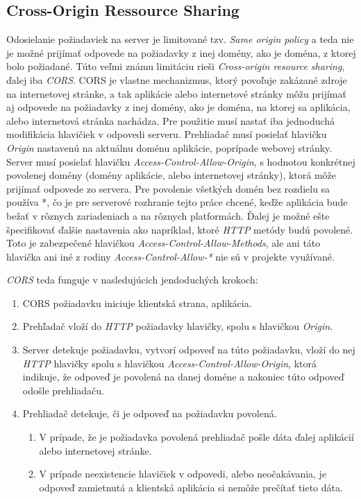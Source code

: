 \subsection{Cross-Origin Ressource Sharing}
Odosielanie požiadaviek na server je limitované tzv. \textit{Same origin policy} a teda nie je možné prijímať odpovede na požiadavky z inej domény, ako je doména, z ktorej bolo požiadané. Túto veľmi známu limitáciu rieši \textit{Cross-origin resource sharing}, ďalej iba \textit{CORS}. CORS je vlastne mechanizmus, ktorý povoľuje zakázané zdroje na internetovej stránke, a tak aplikácie alebo internetové stránky môžu prijímať aj odpovede na požiadavky z inej domény, ako je doména, na ktorej sa aplikácia, alebo internetová stránka nachádza. Pre použitie musí nastať iba jednoduchá modifikácia hlavičiek v odpovedi serveru. Prehliadač musí posielať hlavičku \textit{Origin} nastavenú na aktuálnu doménu aplikácie, poprípade webovej stránky. Server musí posielať hlavičku \textit{Access-Control-Allow-Origin}, s hodnotou konkrétnej povolenej domény (domény aplikácie, alebo internetovej stránky), ktorá môže prijímať odpovede zo servera. Pre povolenie všetkých domén bez rozdielu sa používa *, čo je pre serverové rozhranie tejto práce chcené, keďže aplikácia bude bežať v rôznych zariadeniach a na rôznych platformách. Ďalej je možné ešte špecifikovať ďalšie nastavenia ako napríklad, ktoré \textit{HTTP} metódy budú povolené. Toto je zabezpečené hlavičkou \textit{Access-Control-Allow-Methods}, ale ani táto hlavička ani iné z rodiny \textit{Access-Control-Allow-*} nie sú v projekte využívané. 

\textit{CORS} teda funguje v nasledujúcich jendoduchých krokoch:
\begin{enumerate}
\item CORS požiadavku iniciuje klientská strana, aplikácia.
\item Prehľadač vloží do \textit{HTTP} požiadavky hlavičky, spolu s hlavičkou \textit{Origin}.
\item Server detekuje požiadavku, vytvorí odpoveď na túto požiadavku, vloží do nej \textit{HTTP} hlavičky spolu s hlavičkou \textit{Access-Control-Allow-Origin}, ktorá indikuje, že odpoveď je povolená na danej doméne a nakoniec túto odpoveď odošle prehliadaču.
\item Prehliadač detekuje, či je odpoveď na požiadavku povolená.
    \begin{enumerate}
    \item V prípade, že je požiadavka povolená prehliadač pošle dáta ďalej aplikácií alebo internetovej stránke.
    \item V prípade neexistencie hlavičiek v odpovedi, alebo neočakávania, je odpoveď zamietnutá a klientská aplikácia si nemôže prečítať tieto dáta.
    \end{enumerate}
\end{enumerate}


